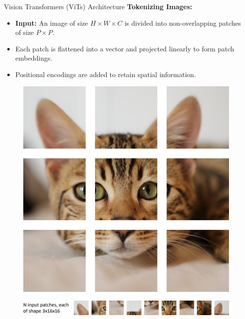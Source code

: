\begin{frame}[allowframebreaks]{Vision Transformers (ViTs) Architecture}
    \textbf{Tokenizing Images:}
    \begin{itemize}
        \item \textbf{Input:} An image of size $H \times W \times C$ is divided into non-overlapping patches of size $P \times P$.
        \item Each patch is flattened into a vector and projected linearly to form patch embeddings.
        \item Positional encodings are added to retain spatial information.
    \end{itemize}

    \framebreak

    \begin{figure}
        \centering
        \includegraphics[width=\linewidth,height=0.9\textheight,keepaspectratio]{images/vit/slide_58_1_img.jpg}
    \end{figure}

    \framebreak

    \begin{figure}
        \flushleft
        \includegraphics[width=0.85\linewidth,height=\textheight,keepaspectratio]{images/vit/slide_59_1_img.jpg}
    \end{figure}


\end{frame}

